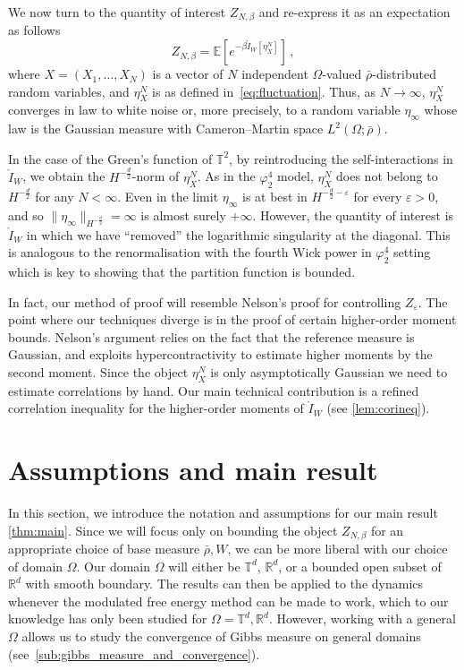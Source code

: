 \documentclass[a4paper,10pt,twoside]{amsart}
\theoremstyle{remark}
\theoremstyle{definition}
\numberwithin{equation}{section}
\newcommand{\T}{\mathbb{T}}
\newcommand{\eps}{\varepsilon}
\newcommand{\R}{\mathbb{R}}
\newcommand{\0}{{\bf 0}}
\newcommand{\+}{\hspace{-.5ex}+\hspace{-.5ex}}
\begin{document}
We now turn to the quantity of interest $Z_{N, \beta}$ and re-express it as an expectation as follows
\begin{equation}
  Z_{N,\beta}= \mathbb{E} \left[e^{-\beta\mathring{I}_W[\eta^N_X]}\right]\, ,
\end{equation}
where $X=(X_1,\dots,X_N)$ is a vector of $N$ independent $\Omega$-valued $\bar\rho$-distributed random variables, and $\eta^N_X$ is as defined in~\eqref{eq:fluctuation}. Thus, as $N\to \infty$,  $\eta^N_X$ converges in law to white noise or, more precisely, to a random variable $\eta_\infty$ whose law is the Gaussian measure with Cameron--Martin space $L^2(\Omega;\bar\rho)$. 

In the case of the Green's function of $\T^2$, by reintroducing the self-interactions in $\mathring{I}_W$, we obtain the $H^{-\frac{d}{2}}$-norm of $\eta^N_X$. As in the $\varphi^4_2$ model, $\eta^N_X$ does not belong to $H^{-\frac{d}{2}}$ for any $N < \infty$. Even in the limit $\eta_\infty$ is at best in $H^{-\frac{d}{2}-\eps}$ for every $\eps>0$, and so $\|\eta_\infty\|_{H^{-\frac{d}{2}}}=\infty$ is almost surely $+\infty$. However, the quantity of interest is $\mathring{I}_W$ in which we have ``removed''  the logarithmic singularity at the diagonal. This is analogous to the renormalisation with the fourth Wick power in $\varphi^4_2$ setting which is key to showing that the partition function is bounded.

In fact, our method of proof will resemble Nelson's proof for controlling $Z_\eps$. The point where our techniques diverge is in the proof of certain higher-order moment bounds. Nelson's argument relies on the fact that the reference measure is Gaussian, and exploits hypercontractivity to estimate higher moments by the second moment. Since the object $\eta^N_X$ is only asymptotically Gaussian we need to estimate correlations by hand. Our main technical contribution is a refined correlation inequality for the higher-order moments of $\mathring{I}_W$ (see \cref{lem:corineq}).

\section{Assumptions and main result} %
\label{sec:preliminaries_and_main_results}
In this section, we introduce the notation and assumptions for our main result \cref{thm:main}. Since we will focus only on bounding the object $Z_{N,\beta}$ for an appropriate choice of base measure $\bar{\rho},W$, we can be more liberal with our choice of domain $\Omega$. Our domain $\Omega$ will either be $\T^d$, $\R^d$, or a bounded open subset of $\R^d$ with smooth boundary. The results can then be applied to the dynamics whenever the modulated free energy method can be made to work,  which to our knowledge has only been studied for $\Omega=\T^d,\R^d$. However, working with a general $\Omega$ allows us to study the convergence of Gibbs measure on general domains (see~\cref{sub:gibbs_measure_and_convergence}).
\end{document}

